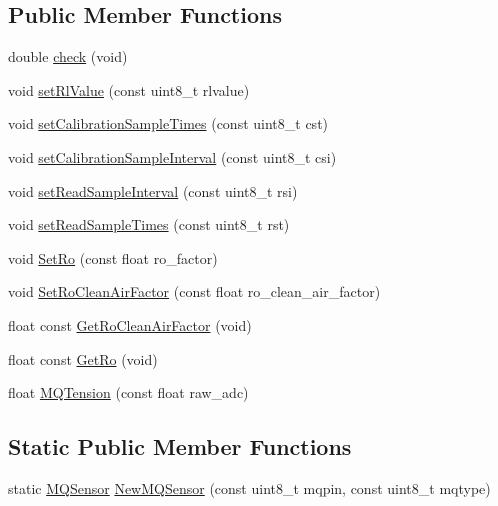 \subsection*{Public Member Functions}
\begin{DoxyCompactItemize}
\item 
double \hyperlink{class_m_q_sensor_a3b011e9da2ebc25fe596444fa3cb026d}{check} (void)
\item 
void \hyperlink{class_m_q_sensor_a54d01cd9465f177f431f070f7e96821d}{set\+Rl\+Value} (const uint8\+\_\+t rlvalue)
\item 
void \hyperlink{class_m_q_sensor_ad93e118f8bce230241af72307a7c2b79}{set\+Calibration\+Sample\+Times} (const uint8\+\_\+t cst)
\item 
void \hyperlink{class_m_q_sensor_ad14ad2558241aac29113e13b8a5137f7}{set\+Calibration\+Sample\+Interval} (const uint8\+\_\+t csi)
\item 
void \hyperlink{class_m_q_sensor_acefcf4fca770e50814f32bac2c80459c}{set\+Read\+Sample\+Interval} (const uint8\+\_\+t rsi)
\item 
void \hyperlink{class_m_q_sensor_a8e4a65e66a55f8abbe4365400e27ab97}{set\+Read\+Sample\+Times} (const uint8\+\_\+t rst)
\item 
void \hyperlink{class_m_q_sensor_a03eb97a82d462ee54ed249bc11da916a}{Set\+Ro} (const float ro\+\_\+factor)
\item 
void \hyperlink{class_m_q_sensor_a870f6dacc4896cdea8cb114b3b508ea3}{Set\+Ro\+Clean\+Air\+Factor} (const float ro\+\_\+clean\+\_\+air\+\_\+factor)
\item 
float const \hyperlink{class_m_q_sensor_a48389f7f5b5757092f7ae7a0893fe33f}{Get\+Ro\+Clean\+Air\+Factor} (void)
\item 
float const \hyperlink{class_m_q_sensor_a7292dbbdb30f7dac813f16009b6cd282}{Get\+Ro} (void)
\item 
float \hyperlink{class_m_q_sensor_a0f3bae5bf979432426997711ffed8acb}{M\+Q\+Tension} (const float raw\+\_\+adc)
\end{DoxyCompactItemize}
\subsection*{Static Public Member Functions}
\begin{DoxyCompactItemize}
\item 
static \hyperlink{class_m_q_sensor}{M\+Q\+Sensor} \hyperlink{class_m_q_sensor_a7f29aed48ad89d8403f08a4e83b136b5}{New\+M\+Q\+Sensor} (const uint8\+\_\+t mqpin, const uint8\+\_\+t mqtype)
\end{DoxyCompactItemize}
